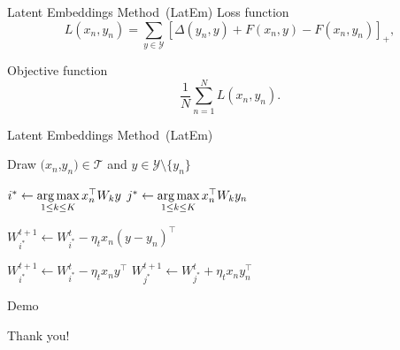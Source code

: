 \documentclass[mathserif, xcolor=table]{beamer}
\def\D{\Delta}
\def\T{\mathcal{T}}
\def\Y{\mathcal{Y}}
\def\argmax{\mathop{\rm arg\,max}\limits}%
\def\Y{\mathcal{Y}}
\begin{document}
\begin{frame}{Latent Embeddings Method~(LatEm)}
Loss function
\begin{equation*}
    L(x_n,y_n) = \sum_{y \in \Y} \left[\D(y_n,y) + F(x_n,y) -F(x_n,y_n)\right]_+,
\end{equation*}
\pause

Objective function
\begin{equation*}
\frac{1}{N} \sum_{n=1}^{N} L(x_n, y_n).
\end{equation*}

\end{frame}

\begin{frame}{Latent Embeddings Method~(LatEm)}
\begin{algorithm}[H]
\small
\begin{algorithmic}[1]
\small
	\FORALL {$n=1$ to $|\T|$} 
      		\STATE  Draw $(x_n$,$y_n) \in \T$ and $y \in \Y \setminus \{y_n\}$ 
      		\pause

      			\pause

				\STATE $i^* \leftarrow \argmax\limits_{1\leq k\leq K} x_n^\top W_k y$
				\STATE $j^* \leftarrow \argmax\limits_{1\leq k\leq K} x_n^\top W_k y_n $  
				      			\pause

				\STATE $W_{i^*}^{t+1} \leftarrow W_{i^*}^{t} - \eta_t x_n (y - y_n)^\top$
				\ENDIF
				      			\pause

          			\STATE $W_{i^*}^{t+1} \leftarrow W_{i^*}^{t} - \eta_t x_n y^\top$ 
          			\STATE $W_{j^*}^{t+1} \leftarrow W_{j^*}^{t} + \eta_t x_n y_n^\top$ 
          			\ENDIF
        		\ENDIF
      \ENDFOR
    \ENDFOR
\end{algorithmic}
\caption*{Algorithm: SGD optimization of LatEm }
\label{alg:seq}
\end{algorithm}


\end{frame}


\begin{frame}{Demo}


\end{frame}

\begin{frame}{}
\center
\huge
Thank you!

\end{frame}
\end{document}
